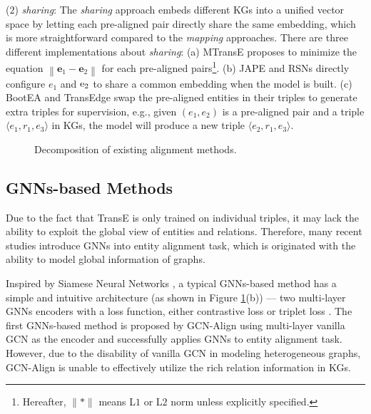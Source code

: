 \documentclass[sigconf,camera-ready]{acmart}
\begin{document}
($2$) \emph{sharing}:
The \emph{sharing} approach embeds different KGs into a unified vector space by letting each pre-aligned pair directly share the same embedding, which is more straightforward compared to the \emph{mapping} approaches.
There are three different implementations about \emph{sharing}:
(a) MTransE \cite{DBLP:conf/ijcai/ChenTYZ17} proposes to minimize the equation ${\left\| \bm{e}_1 - \bm{e}_2\right\|}$ for each pre-aligned pairs\footnote{Hereafter, $\|*\|$ means L$1$ or L$2$ norm unless explicitly specified.}.
(b) JAPE \cite{DBLP:conf/semweb/SunHL17} and RSNs \cite{DBLP:conf/icml/GuoSH19} directly configure ${e_1}$ and $\rm{e_2}$ to share a common embedding when the model is built.
(c) BootEA \cite{DBLP:conf/ijcai/SunHZQ18} and TransEdge \cite{DBLP:conf/semweb/SunHHCGQ19} swap the pre-aligned entities in their triples to generate extra triples for supervision,
e.g., given $(e_1, e_2)$ is a pre-aligned pair and a triple $\langle e_1, r_1, e_3\rangle$ in KGs, the model will produce a new triple $\langle e_2, r_1, e_3\rangle$.

\begin{figure}
  \caption{Decomposition of existing alignment methods.}\label{figure:rw}
\end{figure}

\subsection{GNNs-based Methods}
Due to the fact that TransE is only trained on individual triples, it may lack the ability to exploit the global view of entities and relations.
Therefore, many recent studies introduce GNNs into entity alignment task, which is originated with the ability to model global information of graphs.

Inspired by Siamese Neural Networks \cite{DBLP:conf/cvpr/ChopraHL05}, a typical GNNs-based method has a simple and intuitive architecture (as shown in Figure \ref{figure:rw}(b)) --- two multi-layer GNNs encoders with a loss function, either contrastive loss \cite{DBLP:conf/cvpr/HadsellCL06} or triplet loss \cite{DBLP:conf/cvpr/SchroffKP15}.
The first GNNs-based method is proposed by GCN-Align \cite{DBLP:conf/emnlp/WangLLZ18} using multi-layer vanilla GCN as the encoder and successfully applies GNNs to entity alignment task.
However, due to the disability of vanilla GCN in modeling heterogeneous graphs, GCN-Align is unable to effectively utilize the rich relation information in KGs.
\end{document}
